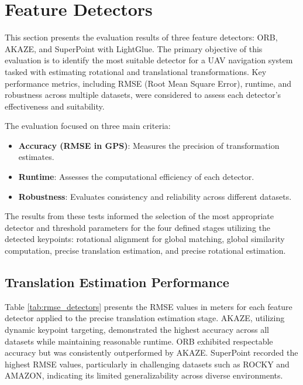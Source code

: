 \section{Feature Detectors}

This section presents the evaluation results of three feature detectors: ORB, AKAZE, and SuperPoint with LightGlue. The primary objective of this evaluation is to identify the most suitable detector for a UAV navigation system tasked with estimating rotational and translational transformations. Key performance metrics, including RMSE (Root Mean Square Error), runtime, and robustness across multiple datasets, were considered to assess each detector's effectiveness and suitability.


The evaluation focused on three main criteria:
\begin{itemize}
    \item \textbf{Accuracy (RMSE in GPS)}: Measures the precision of transformation estimates.
    \item \textbf{Runtime}: Assesses the computational efficiency of each detector.
    \item \textbf{Robustness}: Evaluates consistency and reliability across different datasets.
\end{itemize}

The results from these tests informed the selection of the most appropriate detector and threshold parameters for the four defined stages utilizing the detected keypoints: rotational alignment for global matching, global similarity computation, precise translation estimation, and precise rotational estimation.

\subsection{Translation Estimation Performance}

Table \ref{tab:rmse_detectors} presents the RMSE values in meters for each feature detector applied to the precise translation estimation stage. AKAZE, utilizing dynamic keypoint targeting, demonstrated the highest accuracy across all datasets while maintaining reasonable runtime. ORB exhibited respectable accuracy but was consistently outperformed by AKAZE. SuperPoint recorded the highest RMSE values, particularly in challenging datasets such as ROCKY and AMAZON, indicating its limited generalizability across diverse environments.

